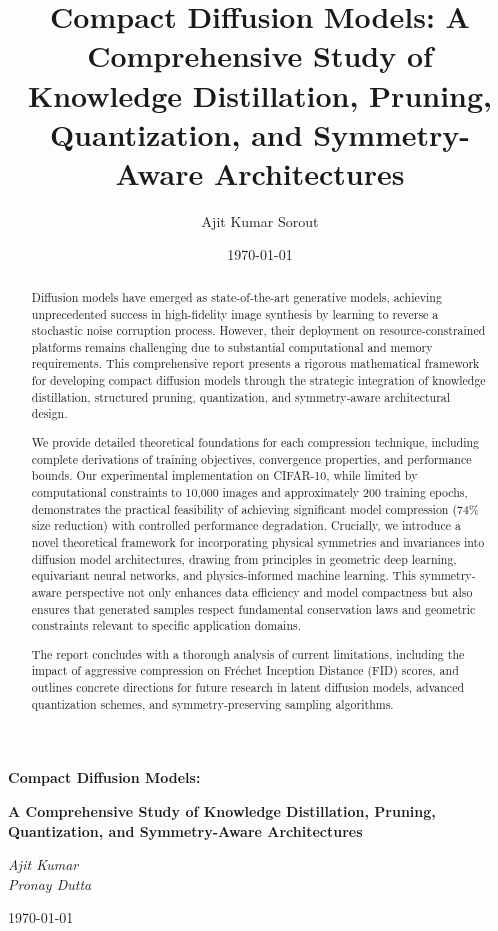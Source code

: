 \documentclass[12pt]{report}
\title{Compact Diffusion Models: A Comprehensive Study of Knowledge Distillation, Pruning, Quantization, and Symmetry-Aware Architectures}
\author{Ajit Kumar Sorout}
\date{\today}
\theoremstyle{definition}
\begin{document}
\begin{titlepage}
    \centering
    \vspace*{3cm}
    {\huge\bfseries Compact Diffusion Models:\par}
    \vspace{0.5cm}
    {\LARGE\bfseries A Comprehensive Study of Knowledge Distillation, Pruning, Quantization, and Symmetry-Aware Architectures\par}
    \vspace{2cm}
    {\Large\itshape Ajit Kumar \\ Pronay Dutta\par}
    \vfill
    {\large \today\par}
\end{titlepage}

\begin{abstract}
Diffusion models have emerged as state-of-the-art generative models, achieving unprecedented success in high-fidelity image synthesis by learning to reverse a stochastic noise corruption process. However, their deployment on resource-constrained platforms remains challenging due to substantial computational and memory requirements. This comprehensive report presents a rigorous mathematical framework for developing compact diffusion models through the strategic integration of knowledge distillation, structured pruning, quantization, and symmetry-aware architectural design.

We provide detailed theoretical foundations for each compression technique, including complete derivations of training objectives, convergence properties, and performance bounds. Our experimental implementation on CIFAR-10, while limited by computational constraints to 10,000 images and approximately 200 training epochs, demonstrates the practical feasibility of achieving significant model compression (74\% size reduction) with controlled performance degradation. Crucially, we introduce a novel theoretical framework for incorporating physical symmetries and invariances into diffusion model architectures, drawing from principles in geometric deep learning, equivariant neural networks, and physics-informed machine learning. This symmetry-aware perspective not only enhances data efficiency and model compactness but also ensures that generated samples respect fundamental conservation laws and geometric constraints relevant to specific application domains.

The report concludes with a thorough analysis of current limitations, including the impact of aggressive compression on Fréchet Inception Distance (FID) scores, and outlines concrete directions for future research in latent diffusion models, advanced quantization schemes, and symmetry-preserving sampling algorithms.
\end{abstract}
\end{document}
